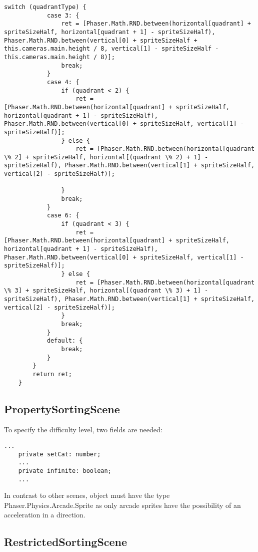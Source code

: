 \begin{lstlisting}[style=TypeScript, caption={returnQuad() (sortingScene.ts)}]
        switch (quadrantType) {
            case 3: {
                ret = [Phaser.Math.RND.between(horizontal[quadrant] + spriteSizeHalf, horizontal[quadrant + 1] - spriteSizeHalf), Phaser.Math.RND.between(vertical[0] + spriteSizeHalf + this.cameras.main.height / 8, vertical[1] - spriteSizeHalf - this.cameras.main.height / 8)];
                break;
            }
            case 4: {
                if (quadrant < 2) {
                    ret = [Phaser.Math.RND.between(horizontal[quadrant] + spriteSizeHalf, horizontal[quadrant + 1] - spriteSizeHalf), Phaser.Math.RND.between(vertical[0] + spriteSizeHalf, vertical[1] - spriteSizeHalf)];
                } else {
                    ret = [Phaser.Math.RND.between(horizontal[quadrant \% 2] + spriteSizeHalf, horizontal[(quadrant \% 2) + 1] - spriteSizeHalf), Phaser.Math.RND.between(vertical[1] + spriteSizeHalf, vertical[2] - spriteSizeHalf)];

                }
                break;
            }
            case 6: {
                if (quadrant < 3) {
                    ret = [Phaser.Math.RND.between(horizontal[quadrant] + spriteSizeHalf, horizontal[quadrant + 1] - spriteSizeHalf), Phaser.Math.RND.between(vertical[0] + spriteSizeHalf, vertical[1] - spriteSizeHalf)];
                } else {
                    ret = [Phaser.Math.RND.between(horizontal[quadrant \% 3] + spriteSizeHalf, horizontal[(quadrant \% 3) + 1] - spriteSizeHalf), Phaser.Math.RND.between(vertical[1] + spriteSizeHalf, vertical[2] - spriteSizeHalf)];
                }
                break;
            }
            default: {
                break;
            }
        }
        return ret;
    }
\end{lstlisting}

\subsection{PropertySortingScene}\label{subsec:propertysortingscene}
To specify the difficulty level, two fields are needed:
\begin{lstlisting}[style=TypeScript, caption={Level fields (propertySortingScene.ts)}]
    ...
    private setCat: number;
    ...
    private infinite: boolean;
    ...
\end{lstlisting}

In contrast to other scenes, object must have the type Phaser.Physics.Arcade.Sprite as only arcade sprites have the
possibility of an acceleration in a direction.

\subsection{RestrictedSortingScene}\label{subsec:restrictedsortingscene}
